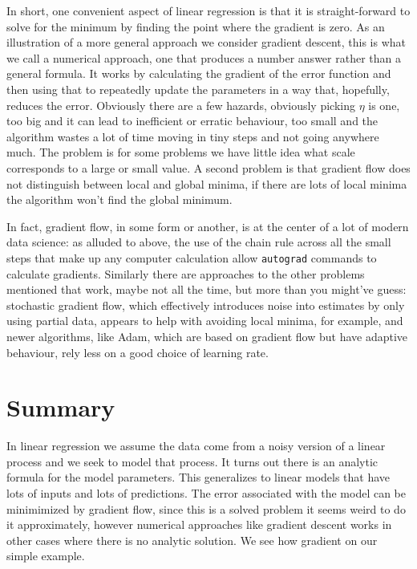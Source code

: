 \documentclass[12pt]{article}
\begin{document}
In short, one convenient aspect of linear regression is that it is
straight-forward to solve for the minimum by finding the point where
the gradient is zero. As an illustration of a more general approach we
consider gradient descent, this is what we call a numerical approach,
one that produces a number answer rather than a general formula. It
works by calculating the gradient of the error function and then using
that to repeatedly update the parameters in a way that, hopefully,
reduces the error. Obviously there are a few hazards, obviously
picking $\eta$ is one, too big and it can lead to inefficient or
erratic behaviour, too small and the algorithm wastes a lot of time
moving in tiny steps and not going anywhere much. The problem is for
some problems we have little idea what scale corresponds to a large or
small value. A second problem is that gradient flow does not
distinguish between local and global minima, if there are lots of
local minima the algorithm won't find the global minimum.

In fact, gradient flow, in some form or another, is at the center of a
lot of modern data science: as alluded to above, the use of the chain
rule across all the small steps that make up any computer calculation
allow \texttt{autograd} commands to calculate gradients. Similarly
there are approaches to the other problems mentioned that work, maybe
not all the time, but more than you might've guess: stochastic
gradient flow, which effectively introduces noise into estimates by
only using partial data, appears to help with avoiding local minima,
for example, and newer algorithms, like Adam, which are based on
gradient flow but have adaptive behaviour, rely less on a good choice
of learning rate.

\section*{Summary}
In linear regression we assume the data come from a noisy version of a
linear process and we seek to model that process. It turns out there
is an analytic formula for the model parameters. This generalizes to
linear models that have lots of inputs and lots of predictions. The
error associated with the model can be minimimized by gradient flow,
since this is a solved problem it seems weird to do it approximately,
however numerical approaches like gradient descent works in other
cases where there is no analytic solution. We see how gradient on our
simple example.
\end{document}
